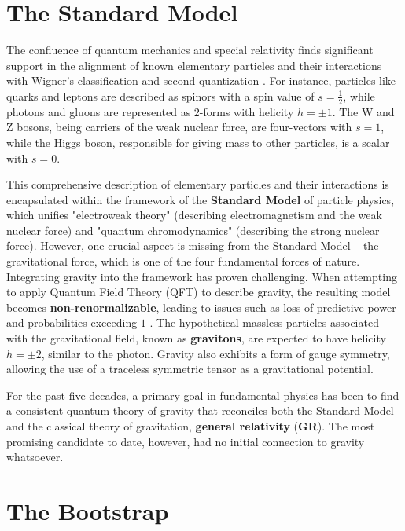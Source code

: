 \documentclass[12pt]{article}
\begin{document}
\section{The Standard Model}

The confluence of quantum mechanics and special relativity finds significant support in the alignment of known elementary particles and their interactions with Wigner's classification and second quantization \cite{wigner1939}. For instance, particles like quarks and leptons are described as spinors with a spin value of $s=\tfrac{1}{2}$, while photons and gluons are represented as $2$-forms with helicity $h = \pm 1$. The W and Z bosons, being carriers of the weak nuclear force, are four-vectors with $s=1$, while the Higgs boson, responsible for giving mass to other particles, is a scalar with $s=0$.

This comprehensive description of elementary particles and their interactions is encapsulated within the framework of the \textbf{Standard Model} of particle physics, which unifies "electroweak theory" (describing electromagnetism and the weak nuclear force) and "quantum chromodynamics" (describing the strong nuclear force). However, one crucial aspect is missing from the Standard Model – the gravitational force, which is one of the four fundamental forces of nature. Integrating gravity into the framework has proven challenging. When attempting to apply Quantum Field Theory (QFT) to describe gravity, the resulting model becomes \textbf{non-renormalizable}, leading to issues such as loss of predictive power and probabilities exceeding $1$ \cite{weinberg1979ultraviolet}. The hypothetical massless particles associated with the gravitational field, known as \textbf{gravitons}, are expected to have helicity $h = \pm 2$, similar to the photon. Gravity also exhibits a form of gauge symmetry, allowing the use of a traceless symmetric tensor as a gravitational potential.

For the past five decades, a primary goal in fundamental physics has been to find a consistent quantum theory of gravity that reconciles both the Standard Model and the classical theory of gravitation, \textbf{general relativity} (\textbf{GR}). The most promising candidate to date, however, had no initial connection to gravity whatsoever.

\section{The Bootstrap}
\end{document}
